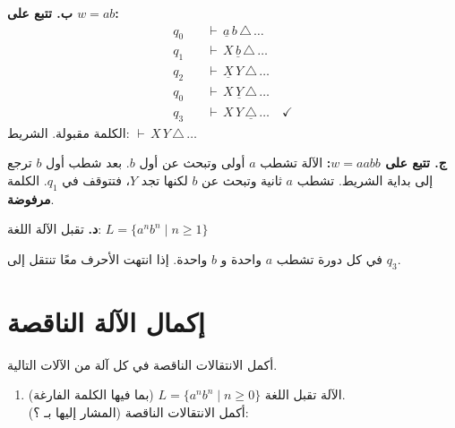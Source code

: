 \documentclass[14pt]{extarticle}
\begin{document}
\begin{enumerate}[itemsep=4em]
\begin{enumerate}[itemsep=4em]
\begin{enumerate}[itemsep=2em]
\begin{boxSolution}
\textbf{ب. تتبع على $w = ab$:}
\begin{align*}
q_0 \quad &\vdash \, \underline{a} \, b \, \triangle \, \ldots \\
q_1 \quad &\vdash \, X \, \underline{b} \, \triangle \, \ldots \\
q_2 \quad &\vdash \, \underline{X} \, Y \, \triangle \, \ldots \\
q_0 \quad &\vdash \, X \, \underline{Y} \, \triangle \, \ldots \\
q_3 \quad &\vdash \, X \, Y \, \underline{\triangle} \, \ldots \quad \checkmark
\end{align*}
الكلمة مقبولة. الشريط: $\vdash \, X \, Y \, \triangle \, \ldots$

\textbf{ج. تتبع على $w = aabb$:}
الآلة تشطب $a$ أولى وتبحث عن أول $b$. بعد شطب أول $b$ ترجع إلى بداية الشريط. تشطب $a$ ثانية وتبحث عن $b$ لكنها تجد $Y$، فتتوقف في $q_1$. الكلمة \textbf{مرفوضة}.

\textbf{د.} تقبل الآلة اللغة: $L = \{ a^n b^n \mid n \geq 1 \}$

في كل دورة تشطب $a$ واحدة و $b$ واحدة. إذا انتهت الأحرف معًا تنتقل إلى $q_3$.
\end{boxSolution}
\clearpage
\fi

\end{enumerate}

\clearpage
\section{إكمال الآلة الناقصة}

أكمل الانتقالات الناقصة في كل آلة من الآلات التالية.

\ifwithsols
\begin{enumerate}[itemsep=4em]
\else
\begin{enumerate}[itemsep=3em]
\fi

\item
الآلة تقبل اللغة $L = \{a^n b^n \mid n \geq 0\}$ (بما فيها الكلمة الفارغة).\\
أكمل الانتقالات الناقصة (المشار إليها بـ ؟):

\begin{center}
\end{center}
\end{enumerate}
\end{enumerate}
\end{enumerate}
\end{enumerate}
\end{document}
